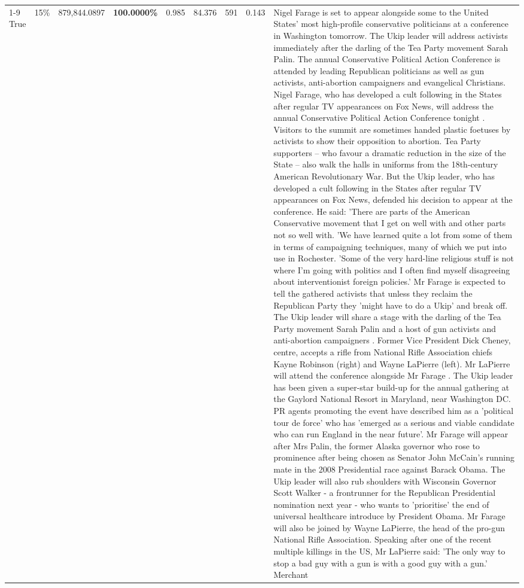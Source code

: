 \begin{table}[H]
\begin{tabular}{lllrlllll}
\cline{1-9} \cline{2-9}
True & 15\% & 879,844.0897 & \bfseries \color{red} 100.0000\% & 0.985 & 84.376 & 591 & 0.143 & Nigel Farage is set to appear alongside some to the United States' most high-profile conservative politicians at a conference in Washington tomorrow. The Ukip leader will address activists immediately after the darling of the Tea Party movement Sarah Palin. The annual Conservative Political Action Conference is attended by leading Republican politicians as well as gun activists, anti-abortion campaigners and evangelical Christians. Nigel Farage, who has developed a cult following in the States after regular TV appearances on Fox News, will address the annual Conservative Political Action Conference tonight . Visitors to the summit are sometimes handed plastic foetuses by activists to show their opposition to abortion. Tea Party supporters – who favour a dramatic reduction in the size of the State – also walk the halls in uniforms from the 18th-century American Revolutionary War. But the Ukip leader, who has developed a cult following in the States after regular TV appearances on Fox News, defended his decision to appear at the conference. He said: 'There are parts of the American Conservative movement that I get on well with and other parts not so well with. 'We have learned quite a lot from some of them in terms of campaigning techniques, many of which we put into use in Rochester. 'Some of the very hard-line religious stuff is not where I'm going with politics and I often find myself disagreeing about interventionist foreign policies.' Mr Farage is expected to tell the gathered activists that unless they reclaim the Republican Party they 'might have to do a Ukip' and break off. The Ukip leader will share a stage with the darling of the Tea Party movement Sarah Palin and a host of gun activists and anti-abortion campaigners . Former Vice President Dick Cheney, centre, accepts a rifle from National Rifle Association chiefs Kayne Robinson (right) and Wayne LaPierre (left). Mr LaPierre will attend the conference alongside Mr Farage . The Ukip leader has been given a super-star build-up for the annual gathering at the Gaylord National Resort in Maryland, near Washington DC. PR agents promoting the event have described him as a 'political tour de force' who has 'emerged as a serious and viable candidate who can run England in the near future'. Mr Farage will appear after Mrs Palin, the former Alaska governor who rose to prominence after being chosen as Senator John McCain's running mate in the 2008 Presidential race against Barack Obama. The Ukip leader will also rub shoulders with Wisconsin Governor Scott Walker - a frontrunner for the Republican Presidential nomination next year - who wants to 'prioritise' the end of universal healthcare introduce by President Obama. Mr Farage will also be joined by Wayne LaPierre, the head of the pro-gun National Rifle Association. Speaking after one of the recent multiple killings in the US, Mr LaPierre said: 'The only way to stop a bad guy with a gun is with a good guy with a gun.' Merchant \\

\end{tabular}
\end{table}
